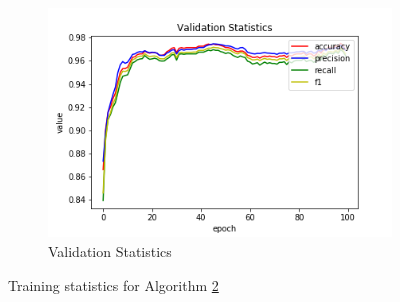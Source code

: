 \begin{figure}[h!]
\begin{subfigure}[b]{0.35\linewidth}
    \includegraphics[width=\linewidth]{images/trained_online_lstm/tile_by_tile_training_block_map_10000_model_validation_stats.png}
     \caption{Validation Statistics}
  \end{subfigure}
  \caption{Training statistics for Algorithm \hyperref[tab: app_evalalgorithms]{2}}
  \label{fig: train_olnine_lstm_2}
\end{figure}

